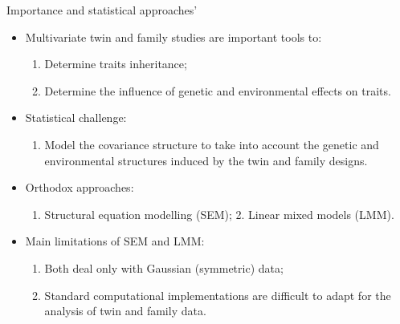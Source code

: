 \documentclass[
  ignorenonframetext,
  serif,
  professionalfont,
  usenames,
  dvipsnames,
  aspectratio = 169]{beamer}
\providecommand{\tightlist}{%
  \setlength{\itemsep}{0pt}\setlength{\parskip}{0pt}}
\renewcommand{\tightlist}{%
  \setlength{\itemsep}{0\baselineskip}
  \setlength{\parskip}{0.25\baselineskip}
}
\begin{document}
\begin{frame}{Importance and statistical approaches'}
\protect\hypertarget{importance-and-statistical-approaches}{}
\begin{itemize}
\tightlist
\item
  Multivariate twin and family studies are important tools to:

  \begin{enumerate}
  \tightlist
  \item
    Determine traits inheritance;
  \item
    Determine the influence of genetic and environmental effects on
    traits.
  \end{enumerate}
\item
  Statistical challenge:

  \begin{enumerate}
  \tightlist
  \item
    Model the covariance structure to take into account the genetic and
    environmental structures induced by the twin and family designs.
  \end{enumerate}
\item
  Orthodox approaches:

  \begin{enumerate}
  \tightlist
  \item
    Structural equation modelling (SEM); 2. Linear mixed models (LMM).
  \end{enumerate}
\item
  Main limitations of SEM and LMM:

  \begin{enumerate}
  \tightlist
  \item
    Both deal only with Gaussian (symmetric) data;
  \item
    Standard computational implementations are difficult to adapt for
    the analysis of twin and family data.
  \end{enumerate}
\end{itemize}
\end{frame}
\end{document}
